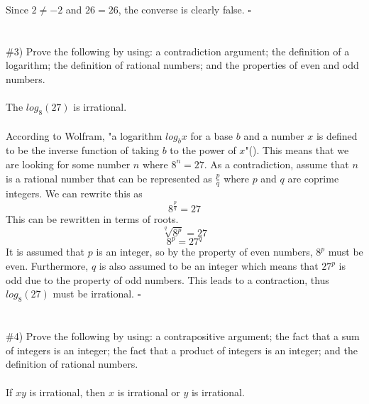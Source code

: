 \documentclass[11pt]{article}
\begin{document}
Since $2 \ne -2$ and $26 = 26$, the converse is clearly false.
$\square$

\section{}

\#3) Prove the following by using: a contradiction argument; the definition of a logarithm; the definition of rational numbers; and the properties of even and odd numbers.
\paragraph{}
The $log_8(27)$ is irrational.
\paragraph{}
According to Wolfram, "a logarithm $log_bx$ for a base $b$ and a number $x$ is defined to be the inverse function of taking $b$ to the power of $x$"(\cite{wolfram}).
This means that we are looking for some number $n$ where $8^n=27$.
As a contradiction, assume that $n$ is a rational number that can be represented as $\frac{p}{q}$ where $p$ and $q$ are coprime integers.
We can rewrite this as
\begin{equation}
	8^{\frac{p}{q}}=27
\end{equation}
This can be rewritten in terms of roots.
\begin{equation}
	\sqrt[q]{8^p}=27
\end{equation}
\begin{equation}
	8^p=27^q
\end{equation}
It is assumed that $p$ is an integer, so by the property of even numbers, $8^p$ must be even.
Furthermore, $q$ is also assumed to be an integer which means that $27^p$ is odd due to the property of odd numbers.
This leads to a contraction, thus $log_8(27)$ must be irrational.
$\square$

\section{}

\#4) Prove the following by using: a contrapositive argument; the fact that a sum of integers is an integer; the fact that a product of integers is an integer; and the definition of rational numbers.
\paragraph{}
If $xy$ is irrational, then $x$ is irrational or $y$ is irrational.
\end{document}
